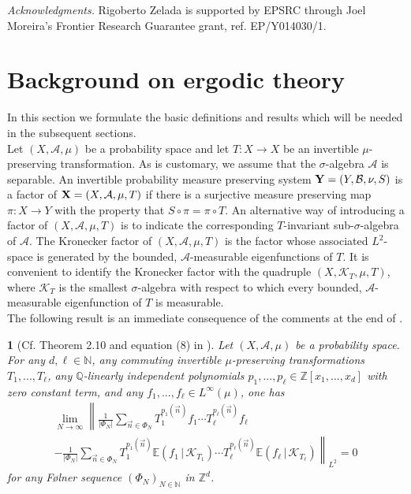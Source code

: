 \documentclass[11pt,american,preprint]{elsarticle}
\numberwithin{equation}{section}
\theoremstyle{plain}
\newtheorem{thm}{\protect\theoremname}[section]
\theoremstyle{plain*}
\theoremstyle{plain}
\theoremstyle{plain*}
\theoremstyle{plain}
\theoremstyle{plain*}
\theoremstyle{remark}
\theoremstyle{remark*}
\theoremstyle{remark}
\theoremstyle{remark*}
\theoremstyle{remark}
\theoremstyle{remark*}
\theoremstyle{plain}
\theoremstyle{definition}
\theoremstyle{plain}
\theoremstyle{plain} %
\providecommand{\theoremname}{Theorem}
\newcommand{\N}{\mathbb{N}}
\newcommand{\Q}{\mathbb{Q}}
\newcommand{\Z}{\mathbb{Z}}
\begin{document}
\textit{Acknowledgments.} Rigoberto Zelada is supported by EPSRC through Joel Moreira's Frontier Research Guarantee grant, ref. EP/Y014030/1. 
\section{Background on ergodic theory}\label{Sec:2}
In this section we formulate the basic definitions and results which will be needed in the subsequent sections.\\
Let $(X,\mathcal A,\mu)$ be a probability space and let $T:X\rightarrow X$ be an invertible $\mu$-preserving transformation. 
As is customary, we assume that the $\sigma$-algebra $\mathcal A$ is separable. 
An invertible probability measure preserving system ${\bf Y}=(Y,\mathcal B,\nu,S)$ is a factor of $
{\bf X}=(X,\mathcal A,\mu,T)$ if there is a surjective measure preserving map $\pi:X\rightarrow Y$ with the property that $S\circ \pi=\pi\circ T$. An alternative way of introducing a factor of $(X,\mathcal A,\mu,T)$
is to indicate the corresponding $T$-invariant sub-$\sigma$-algebra of $\mathcal A$. The Kronecker factor of $(X,\mathcal A,\mu,T)$ is the factor whose associated $L^2$-space is generated by the bounded, $\mathcal A$-measurable eigenfunctions of $T$. It is convenient to identify the Kronecker factor with the quadruple $(X,\mathcal K_T,\mu,T)$, where $\mathcal K_T$ is the smallest $\sigma$-algebra with respect to which every  bounded, $\mathcal A$-measurable eigenfunction of $T$ is measurable.\\
The following result  is an immediate consequence of the comments at the end of \cite[Subsection 2.7]{FraKuJoinErgForIndependentPolys}.
\begin{thm}[Cf. Theorem 2.10 and equation (8) in
\cite{FraKuJoinErgForIndependentPolys}]
\label{FraKuTheorem}
    Let $(X,\mathcal A,\mu)$ be a probability space. For any $d,\ell\in\N$, any commuting invertible $\mu$-preserving transformations  $T_1,...,T_\ell$, any  $\Q$-linearly independent polynomials $p_1,...,p_\ell\in \Z[x_1,...,x_d]$ with zero constant term, and any $f_1,...,f_\ell\in L^\infty(\mu)$, one has 
\begin{multline}
    \lim_{N\rightarrow\infty}\left\|\frac{1}{|\Phi_N|}\sum_{\vec n\in\Phi_N}T_1^{p_1(\vec n)}f_1\cdots T_\ell^{p_\ell(\vec n)}f_\ell\right.\\
    \left.-\frac{1}{|\Phi_N|}\sum_{\vec n\in\Phi_N}T_1^{p_1(\vec n)}\mathbb E(f_1\,|\,\mathcal K_{T_1})\cdots T_\ell^{p_\ell(\vec n)}\mathbb E(f_\ell\,|\,\mathcal K_{T_\ell})\right\|_{L^2}=0
\end{multline}
for any F{\o}lner sequence $(\Phi_N)_{N\in\N}$ in $\Z^d$.
\end{thm}
\end{document}
